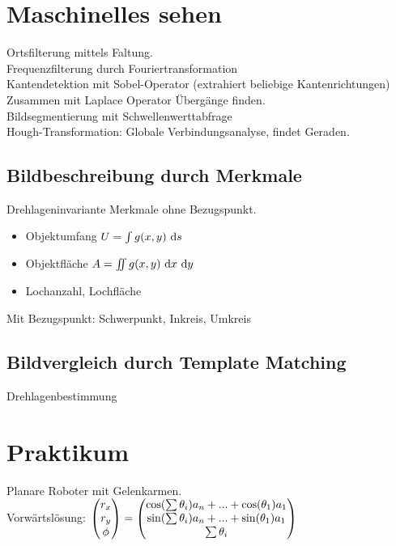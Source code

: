 \documentclass[6pt,a4paper]{scrartcl}
\begin{document}
\begin{multicols}{4}
\section{Maschinelles sehen}
Ortsfilterung mittels Faltung.\\
Frequenzfilterung durch Fouriertransformation\\
Kantendetektion mit Sobel-Operator (extrahiert beliebige Kantenrichtungen)\\
Zusammen mit Laplace Operator Übergänge finden.\\
Bildsegmentierung mit Schwellenwerttabfrage\\
Hough-Transformation: Globale Verbindungsanalyse, findet Geraden.\\

	\subsection{Bildbeschreibung durch Merkmale}
	Drehlageninvariante Merkmale ohne Bezugspunkt.\\
	\begin{itemize}
		\item Objektumfang $U = \int g(x,y) \ \mathrm d s$
		\item Objektfläche $A = \iint g(x,y) \ \mathrm d x \ \mathrm d y$
		\item Lochanzahl, Lochfläche
	\end{itemize}
	
		Mit Bezugspunkt: Schwerpunkt, Inkreis, Umkreis

	\subsection{Bildvergleich durch Template Matching}
	
	Drehlagenbestimmung\\


\section{Praktikum}
Planare Roboter mit Gelenkarmen.\\
Vorwärtslösung: $\begin{pmatrix} r_x \\ r_y \\ \phi  \end{pmatrix} = \begin{pmatrix} \cos(\sum \theta_i)a_n + ... + \cos(\theta_1)a_1 \\ \sin(\sum \theta_i)a_n + ... + \sin(\theta_1)a_1 \\ \sum \theta_i  \end{pmatrix}$\\


\end{multicols}

\end{document}
